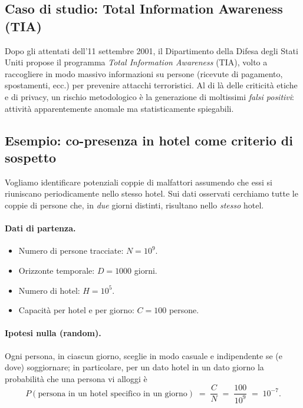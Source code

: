 \subsection{Caso di studio: Total Information Awareness (TIA)}\label{subsec:tia}
Dopo gli attentati dell'11 settembre 2001, il Dipartimento della Difesa degli Stati Uniti propose il programma \emph{Total Information Awareness} (TIA), volto a raccogliere in modo massivo informazioni su persone (ricevute di pagamento, spostamenti, ecc.) per prevenire attacchi terroristici. Al di là delle criticità etiche e di privacy, un rischio metodologico è la generazione di moltissimi \emph{falsi positivi}: attività apparentemente anomale ma statisticamente spiegabili.

\subsection{Esempio: co-presenza in hotel come criterio di sospetto}\label{subsec:esempio-hotel}
Vogliamo identificare potenziali coppie di malfattori assumendo che essi si riuniscano periodicamente nello stesso hotel. Sui dati osservati cerchiamo tutte le coppie di persone che, in \emph{due} giorni distinti, risultano nello \emph{stesso} hotel.
%
\paragraph{Dati di partenza.}
\begin{itemize}
  \item Numero di persone tracciate: $N = 10^9$.
  \item Orizzonte temporale: $D = 1000$ giorni.
  \item Numero di hotel: $H = 10^5$.
  \item Capacità per hotel e per giorno: $C = 100$ persone.
\end{itemize}
\paragraph{Ipotesi nulla (random).} Ogni persona, in ciascun giorno, sceglie in modo casuale e indipendente se (e dove) soggiornare; in particolare, per un dato hotel in un dato giorno la probabilità che una persona vi alloggi è
\[
  P(\text{persona in un hotel specifico in un giorno}) \;=\; \frac{C}{N} \;=\; \frac{100}{10^9} \;=\; 10^{-7}.
\]
